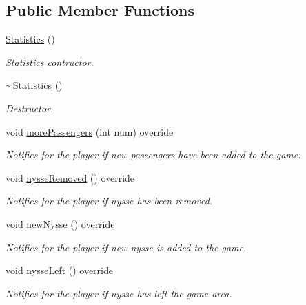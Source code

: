 \subsection*{Public Member Functions}
\begin{DoxyCompactItemize}
\item 
\hyperlink{class_student_side_1_1_statistics_a72567fde7744c67397c116f16fe57aed}{Statistics} ()
\begin{DoxyCompactList}\small\item\em \hyperlink{class_student_side_1_1_statistics}{Statistics} contructor. \end{DoxyCompactList}\item 
\hyperlink{class_student_side_1_1_statistics_aa49cd3fc5b2a5c4de8eea5ed690ffb77}{$\sim$\-Statistics} ()
\begin{DoxyCompactList}\small\item\em Destructor. \end{DoxyCompactList}\item 
void \hyperlink{class_student_side_1_1_statistics_a28c61977ebb56858f1cfe02ea58e22a5}{more\-Passengers} (int num) override
\begin{DoxyCompactList}\small\item\em Notifies for the player if new passengers have been added to the game. \end{DoxyCompactList}\item 
void \hyperlink{class_student_side_1_1_statistics_a95d0c05379ea6127c5d60b329e57bb97}{nysse\-Removed} () override
\begin{DoxyCompactList}\small\item\em Notifies for the player if nysse has been removed. \end{DoxyCompactList}\item 
void \hyperlink{class_student_side_1_1_statistics_af7fbe87b0c1ae4bab650ba8c53a3f677}{new\-Nysse} () override
\begin{DoxyCompactList}\small\item\em Notifies for the player if new nysse is added to the game. \end{DoxyCompactList}\item 
void \hyperlink{class_student_side_1_1_statistics_a2d7ba3c86539914571f493736d274ef0}{nysse\-Left} () override
\begin{DoxyCompactList}\small\item\em Notifies for the player if nysse has left the game area. \end{DoxyCompactList}\item 

\end{DoxyCompactItemize}
